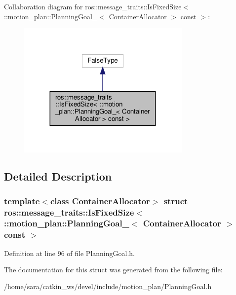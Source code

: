 Collaboration diagram for ros\+:\+:message\+\_\+traits\+:\+:Is\+Fixed\+Size$<$ \+:\+:motion\+\_\+plan\+:\+:Planning\+Goal\+\_\+$<$ Container\+Allocator $>$ const $>$\+:
\nopagebreak
\begin{figure}[H]
\begin{center}
\leavevmode
\includegraphics[width=240pt]{structros_1_1message__traits_1_1IsFixedSize_3_01_1_1motion__plan_1_1PlanningGoal___3_01Containerdcd95daad7188ca0e153341103e449b5}
\end{center}
\end{figure}


\subsection{Detailed Description}
\subsubsection*{template$<$class Container\+Allocator$>$\newline
struct ros\+::message\+\_\+traits\+::\+Is\+Fixed\+Size$<$ \+::motion\+\_\+plan\+::\+Planning\+Goal\+\_\+$<$ Container\+Allocator $>$ const $>$}



Definition at line 96 of file Planning\+Goal.\+h.



The documentation for this struct was generated from the following file\+:\begin{DoxyCompactItemize}
\item 
/home/sara/catkin\+\_\+ws/devel/include/motion\+\_\+plan/Planning\+Goal.\+h\end{DoxyCompactItemize}
